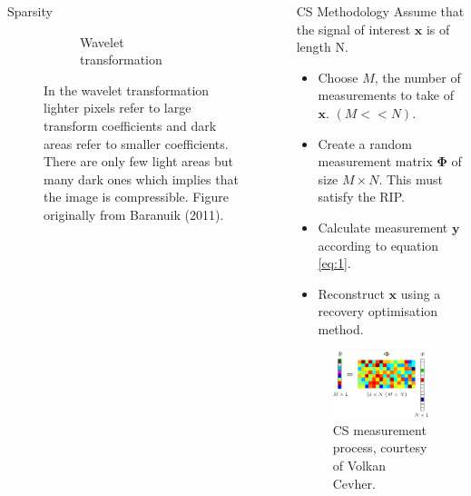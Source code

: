 \documentclass[final]{beamer}
\begin{document}
\begin{frame}{}
\begin{columns}[t]
\begin{column}{0.24\textwidth}
\begin{block}{Sparsity}
\begin{figure}[h]
\begin{subfigure}[b]{0.45\textwidth}
                \caption{Wavelet transformation}
                \label{fig:wt}
        \end{subfigure}
  \caption{In the wavelet transformation lighter pixels refer to large transform coefficients and dark areas refer to smaller coefficients. There are only few light areas but many dark ones which implies that the image is compressible. Figure originally from Baranuik (2011).}
  \label{fig:waveletcoeff}
\end{figure}
\vspace{20pt}

\end{block}

    \end{column}%

    \begin{column}{0.24\textwidth}

		\begin{block}{CS Methodology}
Assume that the signal of interest $\pmb{x}$ is of length N.
                  \begin{itemize}
                  \item Choose $M$, the number of measurements to take of $\pmb{x}$. $(M < < N).$
                    \item Create a random measurement matrix $\pmb{\Phi}$ of size $M \times N$. This must satisfy the RIP. 
                      \item Calculate measurement $\pmb{y}$ according to equation \eqref{eq:1}.
                        \item Reconstruct $\pmb{x}$ using a recovery optimisation method.
                  \end{itemize}

\begin{figure}[h]
        \centering
        \includegraphics{csss}
        \caption{CS measurement process, courtesy of Volkan Cevher.}
      \end{figure}



\end{block}
\end{column}
\end{columns}
\end{frame}
\end{document}
